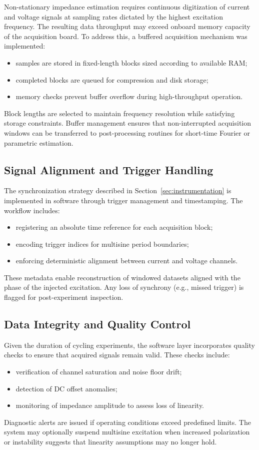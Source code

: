 Non-stationary impedance estimation requires continuous digitization of current and voltage signals at sampling rates dictated by the highest excitation frequency. The resulting data throughput may exceed onboard memory capacity of the acquisition board. To address this, a buffered acquisition mechanism was implemented:
\begin{itemize}
    \item samples are stored in fixed-length blocks sized according to available RAM;
    \item completed blocks are queued for compression and disk storage;
    \item memory checks prevent buffer overflow during high-throughput operation.
\end{itemize}
Block lengths are selected to maintain frequency resolution while satisfying storage constraints. Buffer management ensures that non-interrupted acquisition windows can be transferred to post-processing routines for short-time Fourier or parametric estimation.

\subsection{Signal Alignment and Trigger Handling}

The synchronization strategy described in Section~\ref{sec:instrumentation} is implemented in software through trigger management and timestamping. The workflow includes:
\begin{itemize}
    \item registering an absolute time reference for each acquisition block;
    \item encoding trigger indices for multisine period boundaries;
    \item enforcing deterministic alignment between current and voltage channels.
\end{itemize}
These metadata enable reconstruction of windowed datasets aligned with the phase of the injected excitation. Any loss of synchrony (e.g., missed trigger) is flagged for post-experiment inspection.

\subsection{Data Integrity and Quality Control}

Given the duration of cycling experiments, the software layer incorporates quality checks to ensure that acquired signals remain valid. These checks include:
\begin{itemize}
    \item verification of channel saturation and noise floor drift;
    \item detection of DC offset anomalies;
    \item monitoring of impedance amplitude to assess loss of linearity.
\end{itemize}
Diagnostic alerts are issued if operating conditions exceed predefined limits. The system may optionally suspend multisine excitation when increased polarization or instability suggests that linearity assumptions may no longer hold.

